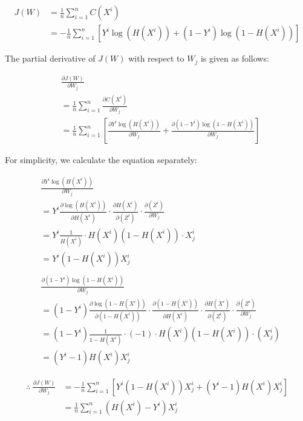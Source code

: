 \documentclass{sig-alternate}
\begin{document}
\begin{equation}
\label{eq:cf}
	\begin{aligned}
	J(W)&=\frac{1}{n}\sum_{i=1}^{n}C(X^{i})\\
		&=-\frac{1}{n}\sum_{i=1}^{n}[Y^{i}\log{(H(X^{i}))}+(1-Y^{i})\log{(1-H(X^{i}))}]
	\end{aligned}
\end{equation}

The partial derivative of $J(W)$ with respect to $W_{j}$ is given as follows:

\begin{align*}
	&\frac{\partial{J(W)}}{\partial{W_{j}}}\\
	&=\frac{1}{n}\sum_{i=1}^{n}\frac{\partial{C(X^{i})}}{\partial{W_{j}}}\\
	&=\frac{1}{n}\sum_{i=1}^{n}[\frac{\partial{Y^{i}\log{(H(X^{i}))}}}{\partial{W_{j}}}+\frac{\partial{(1-Y^{i})\log{(1-H(X^{i}))}}}{\partial{W_{j}}}]
\end{align*}

For simplicity, we calculate the equation separately:

\begin{align*}
	&\frac{\partial{Y^{i}\log{(H(X^{i}))}}}{\partial{W_{j}}}\\
	&=Y^{i}\frac{\partial{\log{(H(X^{i}))}}}{\partial{H(X^{i})}}\cdot \frac{\partial{H(X^{i})}}{\partial{(Z^{i})}}\cdot \frac{\partial{(Z^{i})}}{\partial{W_{j}}}\\
	&=Y^{i}\frac{1}{H(X^{i})}\cdot H(X^{i})(1-H(X^{i}))\cdot X^{i}_{j}\\
	&=Y^{i}(1-H(X^{i}))X^{i}_{j}\\
	\\
	&\frac{\partial{(1-Y^{i})\log{(1-H(X^{i}))}}}{\partial{W_{j}}}\\
	&=(1-Y^{i})\frac{\partial{\log{(1-H(X^{i}))}}}{\partial{(1-H(X^{i}))}}\cdot \frac{\partial{(1-H(X^{i}))}}{\partial{H(X^{i})}} \cdot \frac{\partial{H(X^{i})}}{\partial{(Z^{i})}}\cdot \frac{\partial{(Z^{i})}}{\partial{W_{j}}}\\
	&=(1-Y^{i})\frac{1}{1-H(X^{i})}\cdot (-1)\cdot H(X^{i})(1-H(X^{i}))\cdot (X^{i}_{j})\\
	&=(Y^{i}-1)H(X^{i})X^{i}_{j}
\end{align*}

\begin{align*}
	\therefore~
	\frac{\partial{J(W)}}{\partial{W_{j}}}
	&=-\frac{1}{n}\sum_{i=1}^{n}[Y^{i}(1-H(X^{i}))X^{i}_{j}+(Y^{i}-1)H(X^{i})X^{i}_{j}]\\
	&=\frac{1}{n}\sum_{i=1}^{n}(H(X^{i})-Y^{i})X^{i}_{j}
\end{align*}
\end{document}
